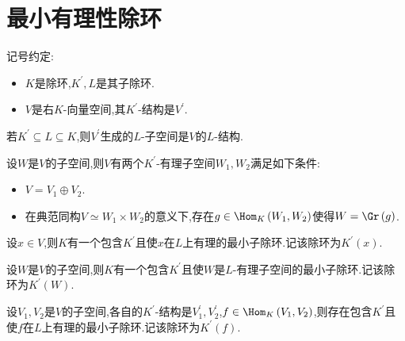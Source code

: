 \section{最小有理性除环}

记号约定:

\begin{itemize}
	\item $K$是除环,$K^{\prime},L$是其子除环.
	\item $V$是右$K$-向量空间,其$K^{\prime}$-结构是$V^{\prime}$.
\end{itemize}

\begin{proposition}{}{}
	若$K^{\prime}\subseteq L\subseteq K$,则$V^{\prime}$生成的$L$-子空间是$V$的$L$-结构.
\end{proposition}

\begin{lemma}{}{}
	设$W$是$V$的子空间,则$V$有两个$K^{\prime}$-有理子空间$W_{1},W_{2}$满足如下条件:
	\begin{itemize}
		\item $V=V_{1}\oplus V_{2}$.
		\item 在典范同构$V\simeq W_{1}\times W_{2}$的意义下,存在$g\in\Hom_{K}\left(W_{1},W_{2}\right)$使得$W=\Gr\left(g\right)$.
	\end{itemize}
\end{lemma}

\begin{proposition}{}{}
	设$x\in V$,则$K$有一个包含$K^{\prime}$且使$x$在$L$上有理的最小子除环.记该除环为$K^{\prime}\left(x\right)$.
\end{proposition}

\begin{proposition}{}{}
	设$W$是$V$的子空间,则$K$有一个包含$K^{\prime}$且使$W$是$L$-有理子空间的最小子除环.记该除环为$K^{\prime}\left(W\right)$.
\end{proposition}

\begin{proposition}{}{}
	设$V_{1},V_{2}$是$V$的子空间,各自的$K^{\prime}$-结构是$V_{1}^{\prime},V_{2}^{\prime}$,$f\in\Hom_{K}\left(V_{1},V_{2}\right)$,则存在包含$K^{\prime}$且使$f$在$L$上有理的最小子除环.记该除环为$K^{\prime}\left(f\right)$.
\end{proposition}
